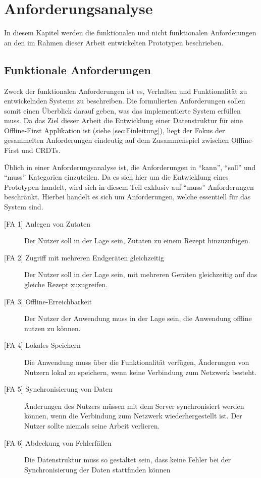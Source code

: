 \documentclass[a4paper, 12pt]{scrreprt}
\begin{document}
\section{Anforderungsanalyse}

In diesem Kapitel werden die funktionalen und nicht funktionalen Anforderungen an den im Rahmen dieser Arbeit entwickelten Prototypen beschrieben.

\subsection{Funktionale Anforderungen}
Zweck der funktionalen Anforderungen ist es, Verhalten und Funktionalität zu entwickelnden Systems zu beschreiben. Die formulierten Anforderungen sollen somit einen Überblick darauf geben, was das implementierte System erfüllen muss. Da das Ziel dieser Arbeit die Entwicklung einer Datenstruktur für eine Offline-First Applikation ist (siehe \ref{sec:Einleitung}), liegt der Fokus der gesammelten Anforderungen eindeutig auf dem Zusammenspiel zwischen Offline-First und CRDTs.

Üblich in einer Anforderungsanalyse ist, die Anforderungen in \enquote{kann}, \enquote{soll} und \enquote{muss} Kategorien einzuteilen. Da es sich hier um die Entwicklung eines Prototypen handelt, wird sich in diesem Teil exklusiv auf \enquote{muss} Anforderungen beschränkt. Hierbei handelt es sich um Anforderungen, welche essentiell für das System sind.

\begin{description}
	\item[{[FA 1]} Anlegen von Zutaten]
	Der Nutzer soll in der Lage sein, Zutaten zu einem Rezept hinzuzufügen.
	\item[{[FA 2]} Zugriff mit mehreren Endgeräten gleichzeitig]
	Der Nutzer soll in der Lage sein, mit mehreren Geräten gleichzeitig auf das gleiche Rezept zuzugreifen.
	\item[{[FA 3]} Offline-Erreichbarkeit]
	Der Nutzer der Anwendung muss in der Lage sein, die Anwendung offline nutzen zu können.
	\item[{[FA 4]} Lokales Speichern]
	Die Anwendung muss über die Funktionalität verfügen, Änderungen von Nutzern lokal zu speichern, wenn keine Verbindung zum Netzwerk besteht.
	\item[{[FA 5]} Synchronisierung von Daten]
	Änderungen des Nutzers müssen mit dem Server synchronisiert werden können, wenn die Verbindung zum Netzwerk wiederhergestellt ist. Der Nutzer sollte niemals seine Arbeit verlieren.
	\item[{[FA 6]} Abdeckung von Fehlerfällen]
	Die Datenstruktur muss so gestaltet sein, dass keine Fehler bei der Synchronisierung der Daten stattfinden können
\end{description}
\end{document}
